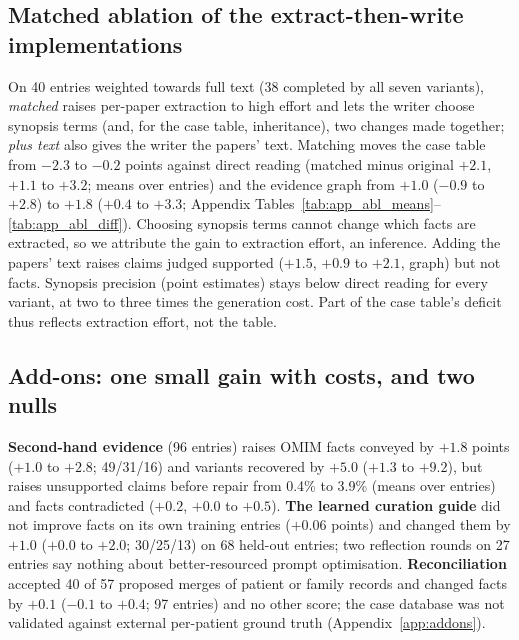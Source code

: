 \documentclass{article} %
\begin{document}
\subsection{Matched ablation of the extract-then-write implementations}
\label{sec:ablation}
On 40 entries weighted towards full text (38 completed by all seven variants), \emph{matched} raises per-paper extraction to high effort and lets the writer choose synopsis terms (and, for the case table, inheritance), two changes made together; \emph{plus text} also gives the writer the papers' text. Matching moves the case table from $-2.3$ to $-0.2$ points against direct reading (matched minus original $+2.1$, $+1.1$ to $+3.2$; means over entries) and the evidence graph from $+1.0$ ($-0.9$ to $+2.8$) to $+1.8$ ($+0.4$ to $+3.3$; Appendix Tables~\ref{tab:app_abl_means}--\ref{tab:app_abl_diff}). Choosing synopsis terms cannot change which facts are extracted, so we attribute the gain to extraction effort, an inference. Adding the papers' text raises claims judged supported ($+1.5$, $+0.9$ to $+2.1$, graph) but not facts. Synopsis precision (point estimates) stays below direct reading for every variant, at two to three times the generation cost. Part of the case table's deficit thus reflects extraction effort, not the table.

\subsection{Add-ons: one small gain with costs, and two nulls}
\label{sec:addons}
\textbf{Second-hand evidence} (96 entries) raises OMIM facts conveyed by $+1.8$ points ($+1.0$ to $+2.8$; 49/31/16) and variants recovered by $+5.0$ ($+1.3$ to $+9.2$), but raises unsupported claims before repair from 0.4\% to 3.9\% (means over entries) and facts contradicted ($+0.2$, $+0.0$ to $+0.5$). \textbf{The learned curation guide} did not improve facts on its own training entries ($+0.06$ points) and changed them by $+1.0$ ($+0.0$ to $+2.0$; 30/25/13) on 68 held-out entries; two reflection rounds on 27 entries say nothing about better-resourced prompt optimisation. \textbf{Reconciliation} accepted 40 of 57 proposed merges of patient or family records and changed facts by $+0.1$ ($-0.1$ to $+0.4$; 97 entries) and no other score; the case database was not validated against external per-patient ground truth (Appendix~\ref{app:addons}).
\end{document}
